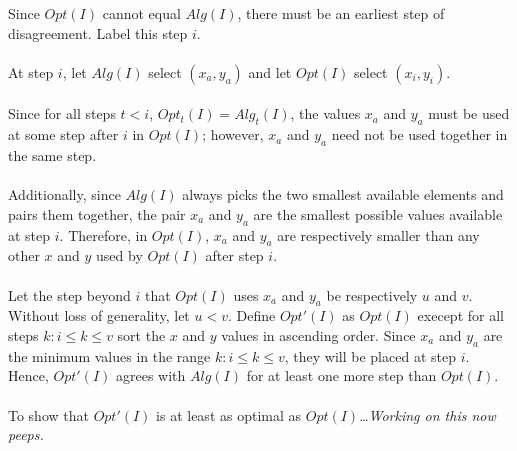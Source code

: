 \documentclass[12pt]{article}
\begin{document}
Since $Opt(I)$ cannot equal $Alg(I)$, there must be an earliest
step of disagreement.  Label this step $i$.\\\\
At step $i$, let $Alg(I)$ select $(x_a, y_a)$ and let $Opt(I)$ select
$(x_i,y_i)$.\\\\
Since for all steps $t < i$, $Opt_t(I) = Alg_t(I)$, the values $x_a$ and
$y_a$ must be used at some step after $i$ in $Opt(I)$; however, $x_a$ and
$y_a$ need not be used together in the same step.\\\\
Additionally, since $Alg(I)$ always picks the two smallest available
elements and pairs them together, the pair $x_a$ and $y_a$ are the smallest
possible values available at step $i$.  Therefore, in $Opt(I)$, $x_a$ and
$y_a$ are respectively smaller than any other $x$ and $y$ used by $Opt(I)$
after step $i$.\\\\
Let the step beyond $i$ that $Opt(I)$ uses
$x_a$ and $y_a$ be respectively $u$ and $v$.  Without loss of generality,
let $u < v$.  Define $Opt'(I)$ as $Opt(I)$ execept for all steps $k: i \leq 
k \leq v$ sort the $x$ and $y$ values in ascending order.  Since $x_a$ and $y_a$
are the minimum values in the range $k: i \leq k \leq v$, they will be placed
at step $i$.  Hence, $Opt'(I)$ agrees with $Alg(I)$ for at least one more
step than $Opt(I)$.\\\\
To show that $Opt'(I)$ is at least as optimal as $Opt(I)$\dots \textit{Working on this 
now peeps.}    
\end{document}

